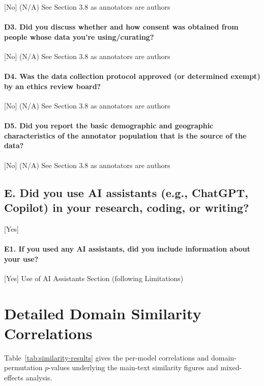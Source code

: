 \documentclass{article}
\begin{document}
[No] (N/A) See Section 3.8 as annotators are authors
\paragraph{D3. Did you discuss whether and how consent was obtained from people whose data you’re using/curating?}

[No] (N/A) See Section 3.8 as annotators are authors
\paragraph{D4. Was the data collection protocol approved (or determined exempt) by an ethics review board?}

[No] (N/A) See Section 3.8 as annotators are authors
\paragraph{D5. Did you report the basic demographic and geographic characteristics of the annotator population that is the source of the data?}

[No] (N/A) See Section 3.8 as annotators are authors

\subsection*{E. Did you use AI assistants (e.g., ChatGPT, Copilot) in your research, coding, or writing?}

[Yes]
\paragraph*{E1. If you used any AI assistants, did you include information about your use?}

[Yes] Use of AI Assistants Section (following Limitations)


\fi
\section{Detailed Domain Similarity Correlations}
\label{app:similarity-results}

Table~\ref{tab:similarity-results} gives the per-model correlations and
domain-permutation $p$-values underlying the main-text similarity figures and
mixed-effects analysis.
\end{document}
